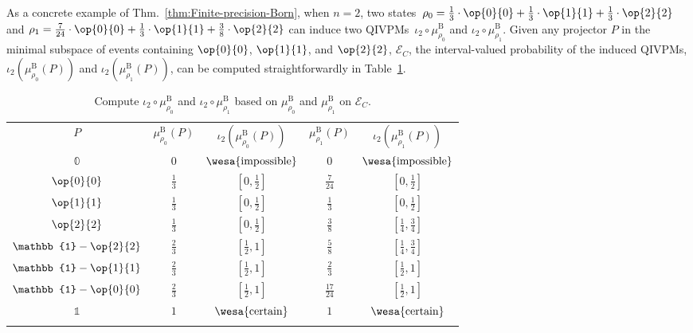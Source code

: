 \documentclass[english,reprint, aps, prl,superscriptaddress, showpacs,
showkeys, longbibliography, amsmath, amssymb, floatfix]{revtex4-1}
\theoremstyle{plain}
\theoremstyle{definition}
\newcommand{\events}{\ensuremath{\mathcal{E}}}
\newcommand{\imposs}{{\text{\wesa{impossible}}}}
\newcommand{\necess}{{\text{\wesa{certain}}}}
\newcommand{\proj}[1]{\op{#1}{#1}}
\begin{document}
As a concrete example of Thm.~\ref{thm:Finite-precision-Born}, when
$n=2$, two states~$\rho_{0}=\frac{1}{3}\cdot\proj{0}+\frac{1}{3}\cdot\proj{1}+\frac{1}{3}\cdot\proj{2}$
and $\rho_{1}=\frac{7}{24}\cdot\proj{0}+\frac{1}{3}\cdot\proj{1}+\frac{3}{8}\cdot\proj{2}$
can induce two QIVPMs~$\iota_{2}\circ\mu_{\rho_{0}}^{\mathrm{B}}$
and $\iota_{2}\circ\mu_{\rho_{1}}^{\mathrm{B}}$. Given any projector
$P$ in the minimal subspace of events containing $\proj{0}$, $\proj{1}$,
and $\proj{2}$, $\events_{C}$, the interval-valued probability of
the induced QIVPMs, $\iota_{2}\left(\mu_{\rho_{0}}^{\mathrm{B}}\left(P\right)\right)$
and $\iota_{2}\left(\mu_{\rho_{1}}^{\mathrm{B}}\left(P\right)\right)$,
can be computed straightforwardly in Table~\ref{tab:Compute-the-QIVPM}.
\begin{table}
\caption{\label{tab:Compute-the-QIVPM}Compute $\iota_{2}\circ\mu_{\rho_{0}}^{\mathrm{B}}$
and $\iota_{2}\circ\mu_{\rho_{1}}^{\mathrm{B}}$ based on $\mu_{\rho_{0}}^{\mathrm{B}}$
and $\mu_{\rho_{1}}^{\mathrm{B}}$ on $\events_{C}$.}

\begin{tabular}{ccccc}
\toprule 
\addlinespace
$P$ & $\mu_{\rho_{0}}^{\mathrm{B}}\left(P\right)$ & $\iota_{2}\left(\mu_{\rho_{0}}^{\mathrm{B}}\left(P\right)\right)$ & $\mu_{\rho_{1}}^{\mathrm{B}}\left(P\right)$ & $\iota_{2}\left(\mu_{\rho_{1}}^{\mathrm{B}}\left(P\right)\right)$\tabularnewline\addlinespace
\midrule
\midrule 
\addlinespace
$\mathbb{0}$ & $0$ & $\imposs$ & $0$ & $\imposs$\tabularnewline\addlinespace
\midrule 
\addlinespace
$\proj{0}$ & $\frac{1}{3}$ & $\left[0,\frac{1}{2}\right]$ & $\frac{7}{24}$ & $\left[0,\frac{1}{2}\right]$\tabularnewline\addlinespace
\midrule 
\addlinespace
$\proj{1}$ & $\frac{1}{3}$ & $\left[0,\frac{1}{2}\right]$ & $\frac{1}{3}$ & $\left[0,\frac{1}{2}\right]$\tabularnewline\addlinespace
\midrule 
\addlinespace
$\proj{2}$ & $\frac{1}{3}$ & $\left[0,\frac{1}{2}\right]$ & $\frac{3}{8}$ & $\left[\tfrac{1}{4},\tfrac{3}{4}\right]$\tabularnewline\addlinespace
\midrule 
\addlinespace
$\mathbb{1}-\proj{2}$ & $\frac{2}{3}$ & $\left[\frac{1}{2},1\right]$ & $\frac{5}{8}$ & $\left[\tfrac{1}{4},\tfrac{3}{4}\right]$\tabularnewline\addlinespace
\midrule 
\addlinespace
$\mathbb{1}-\proj{1}$ & $\frac{2}{3}$ & $\left[\frac{1}{2},1\right]$ & $\frac{2}{3}$ & $\left[\frac{1}{2},1\right]$\tabularnewline\addlinespace
\midrule 
\addlinespace
$\mathbb{1}-\proj{0}$ & $\frac{2}{3}$ & $\left[\frac{1}{2},1\right]$ & $\frac{17}{24}$ & $\left[\frac{1}{2},1\right]$\tabularnewline\addlinespace
\midrule 
\addlinespace
$\mathbb{1}$ & $1$ & $\necess$ & $1$ & $\necess$\tabularnewline\addlinespace
\bottomrule
\end{tabular}
\end{table}
\end{document}
